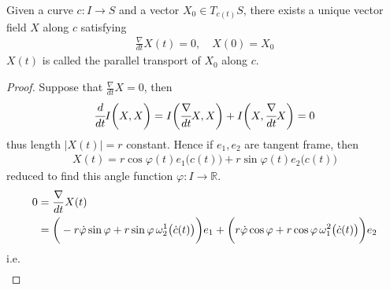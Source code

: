 \documentclass[10pt]{article}
\begin{document}
            \begin{theorem}
                Given a curve $c: I\rightarrow S$ and a vector $X_0\in T_{c(t)}S$, there exists a unique vector field $X$ along $c$ satisfying
                \begin{equation*}
                    \begin{aligned}
                        \frac{\nabla}{dt}X(t) = 0, \quad X(0) = X_0
                    \end{aligned}
                \end{equation*}
                $X(t)$ is called the parallel transport of $X_0$ along $c$.
            \end{theorem}
            \begin{proof}
                Suppose that $\frac{\nabla}{dt}X = 0$, then
                \begin{equation*}
                    \begin{aligned}
                        \cfrac{d}{dt}I\bigg(X, X\bigg) = I\bigg(\cfrac{\nabla}{dt}X, X\bigg) + I\bigg(X, \cfrac{\nabla}{dt}X\bigg) = 0
                    \end{aligned}
                \end{equation*}
                thus length $|X(t)| = r$ constant. Hence if $e_1, e_2$ are tangent frame, then
                \begin{equation*}
                    \begin{aligned}
                        X(t) = r\cos\varphi(t)e_1\big(c(t)\big) + r\sin\varphi(t)e_2\big(c(t)\big)
                    \end{aligned}
                \end{equation*}
                reduced to find this angle function $\varphi: I\rightarrow\mathbb{R}$.
                \begin{equation*}
                    \begin{aligned}
                        0 &= \frac{\nabla}{dt}X(t) \\
                        &= \bigg(-r\dot{\varphi}\sin\varphi + r\sin\varphi\thinspace\omega_2^1\big(\dot{c}(t)\big)\bigg)e_1 + \bigg(r\dot{\varphi}\cos\varphi + r\cos\varphi\thinspace\omega_1^2\big(\dot{c}(t)\big)\bigg)e_2
                    \end{aligned}
                \end{equation*}
                i.e.
                \begin{equation*}
                    \begin{aligned}

\end{aligned}
\end{equation*}
\end{proof}
\end{document}
